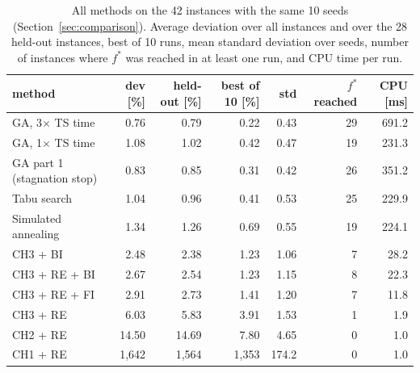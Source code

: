 \begin{table}[t]
\centering\small
\caption{All methods on the 42 instances with the same 10 seeds (Section~\ref{sec:comparison}). Average deviation over all instances and over the 28 held-out instances, best of 10 runs, mean standard deviation over seeds, number of instances where $f^*$ was reached in at least one run, and CPU time per run.}
\label{tab:final}
\begin{tabular}{lrrrrrr}
\toprule
method & dev [\%] & held-out [\%] & best of 10 [\%] & std & $f^*$ reached & CPU [ms] \\
\midrule
GA, 3$\times$ TS time & 0.76 & 0.79 & 0.22 & 0.43 & 29 & 691.2 \\
GA, 1$\times$ TS time & 1.08 & 1.02 & 0.42 & 0.47 & 19 & 231.3 \\
GA part 1 (stagnation stop) & 0.83 & 0.85 & 0.31 & 0.42 & 26 & 351.2 \\
\midrule
Tabu search & 1.04 & 0.96 & 0.41 & 0.53 & 25 & 229.9 \\
Simulated annealing & 1.34 & 1.26 & 0.69 & 0.55 & 19 & 224.1 \\
\midrule
CH3 + BI & 2.48 & 2.38 & 1.23 & 1.06 & 7 & 28.2 \\
CH3 + RE + BI & 2.67 & 2.54 & 1.23 & 1.15 & 8 & 22.3 \\
CH3 + RE + FI & 2.91 & 2.73 & 1.41 & 1.20 & 7 & 11.8 \\
\midrule
CH3 + RE & 6.03 & 5.83 & 3.91 & 1.53 & 1 & 1.9 \\
CH2 + RE & 14.50 & 14.69 & 7.80 & 4.65 & 0 & 1.0 \\
CH1 + RE & 1,642 & 1,564 & 1,353 & 174.2 & 0 & 1.0 \\
\bottomrule
\end{tabular}
\end{table}
